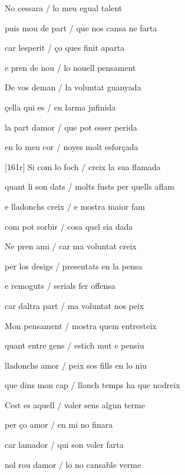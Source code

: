 \documentclass[12pt]{article}
\begin{document}
\begin{estrofa}

 No cessara / lo meu egual talent

 puis mou de part / que nos cansa ne farta

 car lesperit / \c{c}o ques finit aparta

 e pren de nou / lo nouell pensament

 De vos deman / la voluntat guanyada

 \c{c}ella qui es / en larma jnfinida

 la part damor / que pot esser perida

 en lo meu cor / noyes molt esfor\c{c}ada

\end{estrofa}



\begin{estrofa}

 [161r] Si com lo foch / creix la sua flamada

 quant li son dats / molts fusts per quells aflam

 e lladonchs creix / e mostra maior fam

 com pot sorbir / cosa quel sia dada

 Ne pren ami / car ma voluntat creix

 per los desigs / presentats en la pensa

 e remoguts / serials fer offensa

 car daltra part / ma voluntat nos peix

\end{estrofa}



\begin{estrofa}

 Mon pensament / mostra quem entresteix

 quant entre gens / estich mut e pensiu

 lladonchs amor / peix sos fills en lo niu

 que dins mon cap / llonch temps ha que nodreix

 Cest es aquell / voler sens algun terme

 per \c{c}o amor / en mi no finara

 car lamador / qui son voler farta

 nol rou damor / lo no cansable verme

\end{estrofa}
\end{document}
